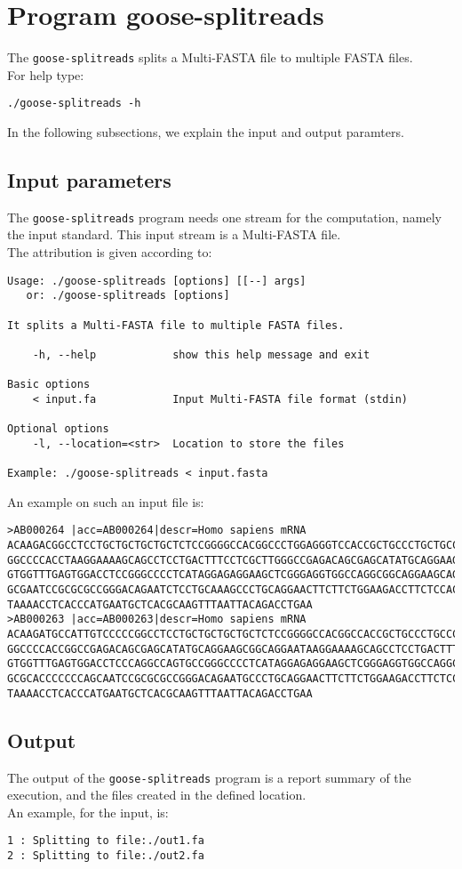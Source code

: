 \section{Program goose-splitreads}
The \texttt{goose-splitreads} splits a Multi-FASTA file to multiple FASTA files.\\
For help type:
\begin{lstlisting}
./goose-splitreads -h
\end{lstlisting}
In the following subsections, we explain the input and output paramters.

\subsection*{Input parameters}

The \texttt{goose-splitreads} program needs one stream for the computation,
namely the input standard. This input stream is a Multi-FASTA file.\\
The attribution is given according to:
\begin{lstlisting}
Usage: ./goose-splitreads [options] [[--] args]
   or: ./goose-splitreads [options]

It splits a Multi-FASTA file to multiple FASTA files.

    -h, --help            show this help message and exit

Basic options
    < input.fa            Input Multi-FASTA file format (stdin)

Optional options
    -l, --location=<str>  Location to store the files

Example: ./goose-splitreads < input.fasta
\end{lstlisting}
An example on such an input file is:
\begin{lstlisting}
>AB000264 |acc=AB000264|descr=Homo sapiens mRNA 
ACAAGACGGCCTCCTGCTGCTGCTGCTCTCCGGGGCCACGGCCCTGGAGGGTCCACCGCTGCCCTGCTGCCATTGTCCCC
GGCCCCACCTAAGGAAAAGCAGCCTCCTGACTTTCCTCGCTTGGGCCGAGACAGCGAGCATATGCAGGAAGCGGCAGGAA
GTGGTTTGAGTGGACCTCCGGGCCCCTCATAGGAGAGGAAGCTCGGGAGGTGGCCAGGCGGCAGGAAGCAGGCCAGTGCC
GCGAATCCGCGCGCCGGGACAGAATCTCCTGCAAAGCCCTGCAGGAACTTCTTCTGGAAGACCTTCTCCACCCCCCCAGC
TAAAACCTCACCCATGAATGCTCACGCAAGTTTAATTACAGACCTGAA
>AB000263 |acc=AB000263|descr=Homo sapiens mRNA 
ACAAGATGCCATTGTCCCCCGGCCTCCTGCTGCTGCTGCTCTCCGGGGCCACGGCCACCGCTGCCCTGCCCCTGGAGGGT
GGCCCCACCGGCCGAGACAGCGAGCATATGCAGGAAGCGGCAGGAATAAGGAAAAGCAGCCTCCTGACTTTCCTCGCTTG
GTGGTTTGAGTGGACCTCCCAGGCCAGTGCCGGGCCCCTCATAGGAGAGGAAGCTCGGGAGGTGGCCAGGCGGCAGGAAG
GCGCACCCCCCCAGCAATCCGCGCGCCGGGACAGAATGCCCTGCAGGAACTTCTTCTGGAAGACCTTCTCCTCCTGCAAA
TAAAACCTCACCCATGAATGCTCACGCAAGTTTAATTACAGACCTGAA
\end{lstlisting}

\subsection*{Output}
The output of the \texttt{goose-splitreads} program is a report summary of the execution, and the files created in the defined location.\\ 
An example, for the input, is:
\begin{lstlisting}
1 : Splitting to file:./out1.fa
2 : Splitting to file:./out2.fa
\end{lstlisting}
